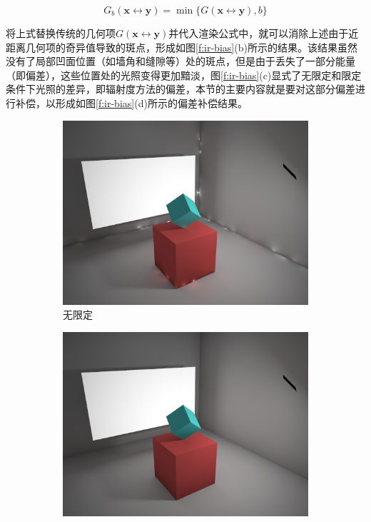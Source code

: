 \begin{equation}
	G_b(\mathbf{x}\leftrightarrow\mathbf{y})=\min\{G(\mathbf{x}\leftrightarrow\mathbf{y}),b\}
\end{equation}

将上式替换传统的几何项$G(\mathbf{x}\leftrightarrow\mathbf{y})$并代入渲染公式中，就可以消除上述由于近距离几何项的奇异值导致的斑点，形成如图\ref{f:ir-bias}(b)所示的结果。该结果虽然没有了局部凹面位置（如墙角和缝隙等）处的斑点，但是由于丢失了一部分能量（即偏差），这些位置处的光照变得更加黯淡，图\ref{f:ir-bias}(c)显式了无限定和限定条件下光照的差异，即辐射度方法的偏差，本节的主要内容就是要对这部分偏差进行补偿，以形成如图\ref{f:ir-bias}(d)所示的偏差补偿结果。

\begin{figure}
\begin{fullwidth}
	\begin{subfigure}[b]{0.246\thewidth}
		\includegraphics[width=1.0\textwidth]{figures/ir/vpl-noclamping}
		\caption{无限定}
	\end{subfigure}
	\begin{subfigure}[b]{0.246\thewidth}
		\includegraphics[width=1.0\textwidth]{figures/ir/vpl-clamping}

\end{subfigure}
\end{fullwidth}
\end{figure}
